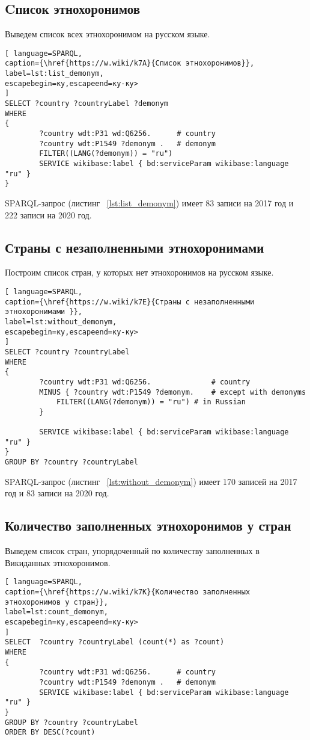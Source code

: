 \subsection{Cписок этнохоронимов}

Выведем список всех этнохоронимом на русском языке.

\begin{lstlisting}[ language=SPARQL, 
caption={\href{https://w.wiki/k7A}{Cписок этнохоронимов}},
label=lst:list_demonym, 
escapebegin=ку,escapeend=ку-ку>
]
SELECT ?country ?countryLabel ?demonym
WHERE
{
		?country wdt:P31 wd:Q6256.      # country
		?country wdt:P1549 ?demonym .   # demonym
		FILTER((LANG(?demonym)) = "ru")
		SERVICE wikibase:label { bd:serviceParam wikibase:language "ru" }
}
\end{lstlisting}

SPARQL-запрос  (листинг ~\ref{lst:list_demonym}) имеет 83 записи на 2017 год и 222 записи на 2020 год.

\subsection{Страны с незаполненными этнохоронимами}

Построим список стран, у которых нет этнохоронимов на русском языке.

\begin{lstlisting}[ language=SPARQL, 
caption={\href{https://w.wiki/k7E}{Страны с незаполненными этнохоронимами }},
label=lst:without_demonym, 
escapebegin=ку,escapeend=ку-ку>
]
SELECT ?country ?countryLabel 
WHERE
{
		?country wdt:P31 wd:Q6256.              # country
		MINUS { ?country wdt:P1549 ?demonym.    # except with demonyms
			FILTER((LANG(?demonym)) = "ru") # in Russian
		}    

		SERVICE wikibase:label { bd:serviceParam wikibase:language "ru" }
}
GROUP BY ?country ?countryLabel
\end{lstlisting}

SPARQL-запрос  (листинг ~\ref{lst:without_demonym}) имеет 170 записей на 2017 год и 83 записи на 2020 год.

\subsection{Количество заполненных этнохоронимов у стран}

Выведем список стран, упорядоченный по количеству заполненных в Викиданных этнохоронимов.

\begin{lstlisting}[ language=SPARQL, 
caption={\href{https://w.wiki/k7K}{Количество заполненных этнохоронимов у стран}},
label=lst:count_demonym, 
escapebegin=ку,escapeend=ку-ку>
]
SELECT  ?country ?countryLabel (count(*) as ?count)
WHERE
{
		?country wdt:P31 wd:Q6256.      # country
		?country wdt:P1549 ?demonym .   # demonym
		SERVICE wikibase:label { bd:serviceParam wikibase:language "ru" }
}
GROUP BY ?country ?countryLabel 
ORDER BY DESC(?count)
\end{lstlisting}

